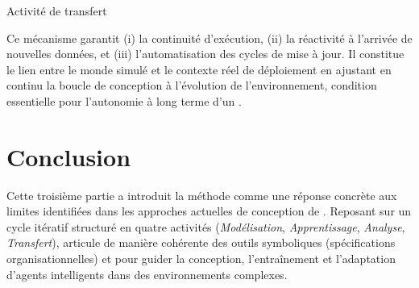 \vspace{-0.3em}
\begin{algorithm}[H]
  \caption{Activité de transfert}
  \label{alg:transferring}
  \DontPrintSemicolon

  \vspace{0.3em}
\end{algorithm}

Ce mécanisme garantit (i) la continuité d'exécution, (ii) la réactivité à l'arrivée de nouvelles données, et (iii) l'automatisation des cycles de mise à jour. Il constitue le lien entre le monde simulé et le contexte réel de déploiement en ajustant en continu la boucle de conception à l'évolution de l'environnement, condition essentielle pour l'autonomie à long terme d'un .

\clearpage
\thispagestyle{empty}
\null
\newpage

\chapter*{Conclusion}

\noindent
Cette troisième partie a introduit la méthode \textbf{} comme une réponse concrète aux limites identifiées dans les approches actuelles de conception de . Reposant sur un cycle itératif structuré en quatre activités (\textit{Modélisation}, \textit{Apprentissage}, \textit{Analyse}, \textit{Transfert}),  articule de manière cohérente des outils symboliques (spécifications organisationnelles) et  pour guider la conception, l'entraînement et l'adaptation d'agents intelligents dans des environnements complexes.

